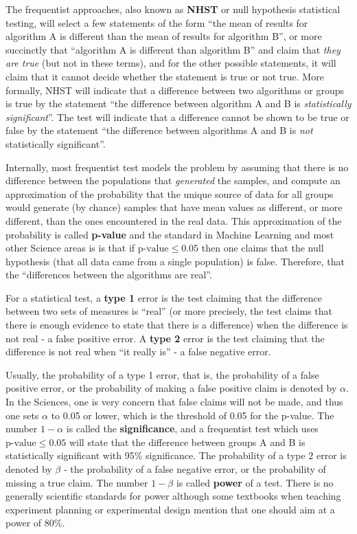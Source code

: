 \documentclass[twoside,11pt,preprint]{article}
\begin{document}
The frequentist approaches, also known as \textbf{NHST} or null hypothesis
statistical testing, will select a few statements of the form ``the
mean of results for algorithm A is different than the mean of results
for algorithm B'', or more succinctly that ``algorithm A is different
than algorithm B'' and claim that \emph{they are true} (but not in these
terms), and for the other possible statements, it will claim that it
cannot decide whether the statement is true or not true. More
formally, NHST will indicate that a difference between two
algorithms or groups is true by the statement ``the difference between algorithm
A and B is \emph{statistically significant}''. The test will indicate that a
difference cannot be shown to be true or false by the statement ``the
difference between algorithms A and B is \emph{not} statistically
significant''.

Internally, most frequentist test models the problem by assuming that
there is no difference between the populations that \emph{generated} the
samples, and compute an approximation of the probability that the
unique source of data for all groups would generate (by chance)
samples that have mean values as different, or more different, than the ones
encountered in the real data. This approximation of the probability
is called \textbf{p-value} and the standard in Machine Learning and most other Science areas is
is that if \(\mbox{p-value} \le 0.05\) then one claims that
the null hypothesis (that all data came from a single population) is
false. Therefore, that the ``differences between the algorithms are real''.

For a statistical test, a \textbf{type 1} error is the
test claiming that the difference between two sets of measures is
``real'' (or more precisely, the test claims that there is enough
evidence to state that there is a difference) when the difference is
not real - a false positive error. A \textbf{type 2} error is the test
claiming that the difference is not real when ``it really is'' - a false
negative error.

Usually, the probability of a type 1 error, that is,
the probability of a false positive error, or the probability of
making a false positive claim is denoted by \(\alpha\). In the Sciences, one is very concern that
false claims will not be made, and thus one sets \(\alpha\) to 0.05 or
lower, which is the threshold of 0.05 for the p-value. The number
\(1-\alpha\) is called the \textbf{significance}, and a frequentist test
which uses \(\mbox{p-value} \le 0.05\) will state that the difference between groups A and B is
statistically significant with 95\% significance. The probability of
a type 2 error is denoted by \(\beta\) - the probability of a false
negative error, or the probability of missing a true claim. The number
\(1-\beta\) is called \textbf{power} of a test. There is no generally
scientific standards for power although some textbooks when teaching
experiment planning or experimental design mention that one should aim at a power of 80\%.
\end{document}
